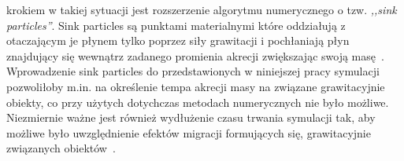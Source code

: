 krokiem w takiej sytuacji jest rozszerzenie algorytmu numerycznego o tzw.
\emph{,,sink particles''}. Sink particles są punktami materialnymi które
oddziałują z otaczającym je płynem tylko poprzez siły grawitacji i pochłaniają
płyn znajdujący się wewnątrz zadanego promienia akrecji zwiększając swoją
masę~\cite{FBCK10}. Wprowadzenie sink particles do przedstawionych w niniejszej
pracy symulacji pozwoliłoby m.in. na określenie tempa akrecji masy na związane
grawitacyjnie obiekty, co przy użytych dotychczas metodach numerycznych nie było
możliwe. Niezmiernie ważne jest również wydłużenie czasu trwania symulacji tak,
aby możliwe było uwzględnienie efektów migracji formujących się, grawitacyjnie
związanych obiektów~\cite{ML14}.



